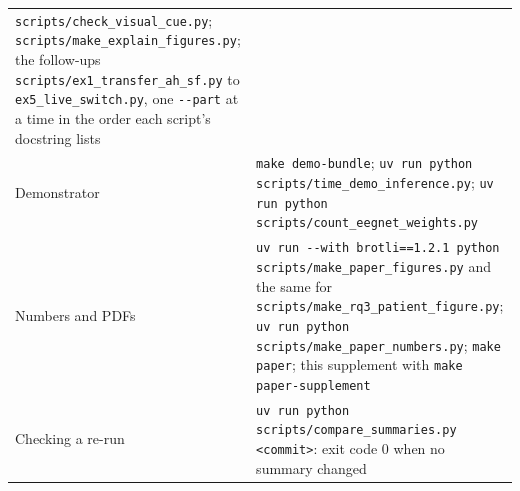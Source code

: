 \begin{center}
\begin{tabularx}{\textwidth}{@{}>{\raggedright\arraybackslash}p{3.0cm}>{\raggedright\arraybackslash}X@{}}
\texttt{scripts/check\_visual\_cue.py}; \texttt{scripts/make\_explain\_figures.py}; the
follow-ups \texttt{scripts/ex1\_transfer\_ah\_sf.py} to \texttt{ex5\_live\_switch.py}, one
\texttt{-{}-part} at a time in the order each script's docstring lists \\
Demonstrator & \texttt{make demo-bundle}; \texttt{uv run python
scripts/time\_demo\_inference.py}; \texttt{uv run python scripts/count\_eegnet\_weights.py} \\
Numbers and PDFs & \texttt{uv run -{}-with
brotli==1.2.1 python scripts/make\_paper\_figures.py} and the same for
\texttt{scripts/make\_rq3\_patient\_figure.py}; \texttt{uv run python
scripts/make\_paper\_numbers.py}; \texttt{make paper}; this supplement with \texttt{make
paper-supplement} \\
Checking a re-run & \texttt{uv run python scripts/compare\_summaries.py <commit>}: exit
code 0 when no summary changed \\
\bottomrule
\end{tabularx}
\end{center}
